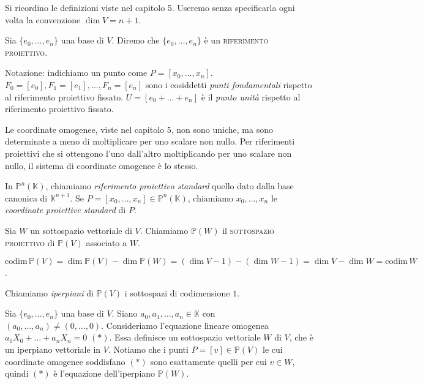 Si ricordino le definizioni viste nel capitolo 5. Useremo senza specificarla ogni volta la convenzione $\dim{V}=n+1$.

\begin{defn}
  Sia $\{e_0, \dots, e_n\}$ una base di $V$. Diremo che $\{e_0, \dots, e_n\}$ è un \textsc{riferimento proiettivo}.
\end{defn}

Notazione: indichiamo un punto come $P=[x_0,\dots,x_n]$. $F_0=[e_0], F_1=[e_1], \dots, F_n=[e_n]$ sono i cosiddetti \textit{punti fondamentali} rispetto al riferimento proiettivo fissato. $U=[e_0+\dots+e_n]$ è il \textit{punto unità} rispetto al riferimento proiettivo fissato.

\begin{oss}
  Le coordinate omogenee, viste nel capitolo 5, non sono uniche, ma sono determinate a meno di moltiplicare per uno scalare non nullo. Per riferimenti proiettivi che si ottengono l'uno dall'altro moltiplicando per uno scalare non nullo, il sistema di coordinate omogenee è lo stesso.
\end{oss}

In $\mathbb{P}^n(\mathbb{K})$, chiamiamo \textit{riferimento proiettivo standard} quello dato dalla base canonica di $\mathbb{K}^{n+1}$. Se $P=[x_0, \dots, x_n] \in \mathbb{P}^n(\mathbb{K})$, chiamiamo $x_0, \dots, x_n$ le \textit{coordinate proiettive standard} di $P$.

\begin{defn}
  Sia $W$ un sottospazio vettoriale di $V$. Chiamiamo $\mathbb{P}(W)$ il \textsc{sottospazio proiettivo} di $\mathbb{P}(V)$ associato a $W$.
\end{defn}

\begin{oss}
  $\text{codim}\,\mathbb{P}(V)=\dim{\mathbb{P}(V)}-\dim{\mathbb{P}(W)}=(\dim{V}-1)-(\dim{W}-1)=\dim{V}-\dim{W}=\text{codim}\,W$.
\end{oss}

\begin{defn}
  Chiamiamo \textit{iperpiani} di $\mathbb{P}(V)$ i sottospazi di codimensione $1$.
\end{defn}

\begin{oss} \label{stessa_equazione}
  Sia $\{e_0, \dots, e_n\}$ una base di $V$. Siano $a_0, a_1, \dots, a_n \in \mathbb{K}$ con $(a_0, \dots, a_n) \not= (0, \dots, 0)$. Consideriamo l'equazione lineare omogenea $a_0X_0+\dots+a_nX_n=0$ $(*)$. Essa definisce un sottospazio vettoriale $W$ di $V$, che è un iperpiano vettoriale in $V$.
  Notiamo che i punti $P=[v] \in \mathbb{P}(V)$ le cui coordinate omogenee soddisfano $(*)$ sono esattamente quelli per cui $v \in W$, quindi $(*)$ è l'equazione dell'iperpiano $\mathbb{P}(W)$.
\end{oss}

